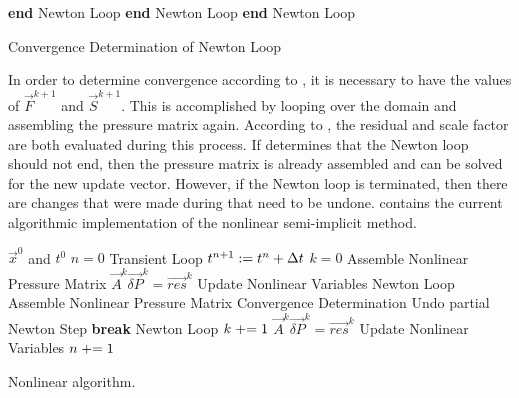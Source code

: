 \begin{algo}[ht!]
\setlength{\baselineskip}{0.625\baselineskip}
\begin{algorithmic}[1]
	\State \textbf{end} Newton Loop
	\State \textbf{end} Newton Loop
	\State \textbf{end} Newton Loop
\EndIf
\end{algorithmic}
\caption{Convergence Determination of Newton Loop}
\label{alg:nlnConvergence}
\end{algo}

In order to determine convergence according to , it is necessary to have the values of $\vec{F}^{k+1}$ and $\vec{S}^{k+1}$.
This is accomplished by looping over the domain and assembling the pressure matrix again.
According to , the residual and scale factor are both evaluated during this process.
If  determines that the Newton loop should not end, then the pressure matrix is already assembled and can be solved for the new update vector.
However, if the Newton loop is terminated, then there are changes that were made during  that need to be undone.
 contains the current algorithmic implementation of the nonlinear semi-implicit method.

\begin{algo}[ht!]
\setlength{\baselineskip}{0.625\baselineskip}
\begin{algorithmic}[1]
\Require $\vec{x}^{0}$ and $t^{0}$
\Set $n = 0$
\Loop \; Transient Loop
    \Set $t^{n+1} : = t^{n} + \dt{}$
    \Set $k = 0$
	\Algorithm Assemble Nonlinear Pressure Matrix	 
	\Solve $\vec{A}^{k} \vec{\delta P}^{k} = \vec{res}^{k}$
	\Algorithm Update Nonlinear Variables  
    \Loop \; Newton Loop
		\Algorithm Assemble Nonlinear Pressure Matrix 
		\Algorithm Convergence Determination 
			\State Undo partial Newton Step
			\State \textbf{break} Newton Loop 
		\EndIf		
		\Set $k \mathrel{+}= 1$
		\Solve $\vec{A}^{k} \vec{\delta P}^{k} = \vec{res}^{k}$
		\Algorithm Update Nonlinear Variables 
	\EndLoop
	\Set $n \mathrel{+}= 1$
\EndLoop
\end{algorithmic}
\caption{Nonlinear \cobra{} algorithm.}
\label{alg:nlnCobraAlgorithm}
\end{algo}

